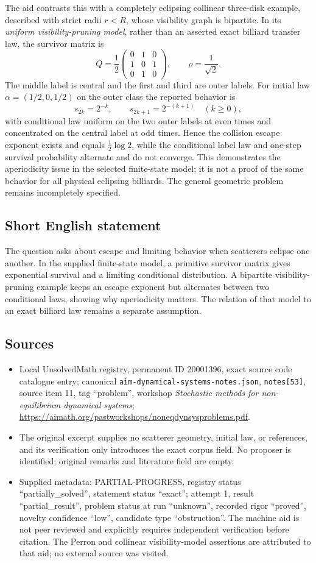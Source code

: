 \documentclass[11pt]{article}
\begin{document}
The aid contrasts this with a completely eclipsing collinear three-disk example, described with strict radii $r<R$, whose visibility graph is bipartite. In its \emph{uniform visibility-pruning model}, rather than an asserted exact billiard transfer law, the survivor matrix is
\[
 Q=\frac12\begin{pmatrix}0&1&0\\1&0&1\\0&1&0\end{pmatrix},
 \qquad\rho=\frac1{\sqrt2}.
\]
The middle label is central and the first and third are outer labels. For initial law $\alpha=(1/2,0,1/2)$ on the outer class the reported behavior is
\[
 s_{2k}=2^{-k},\qquad s_{2k+1}=2^{-(k+1)}\quad(k\geq0),
\]
with conditional law uniform on the two outer labels at even times and concentrated on the central label at odd times. Hence the collision escape exponent exists and equals $\tfrac12\log2$, while the conditional label law and one-step survival probability alternate and do not converge. This demonstrates the aperiodicity issue in the selected finite-state model; it is not a proof of the same behavior for all physical eclipsing billiards. The general geometric problem remains incompletely specified.
\subsection{Short English statement}
The question asks about escape and limiting behavior when scatterers eclipse one another. In the supplied finite-state model, a primitive survivor matrix gives exponential survival and a limiting conditional distribution. A bipartite visibility-pruning example keeps an escape exponent but alternates between two conditional laws, showing why aperiodicity matters. The relation of that model to an exact billiard law remains a separate assumption.
\subsection{Sources}
\begin{itemize}
\item Local UnsolvedMath registry, permanent ID 20001396, exact source code catalogue entry; canonical \texttt{aim-dynamical-systems-notes.json}, \texttt{notes[53]}, source item 11, tag ``problem'', workshop \emph{Stochastic methods for non-equilibrium dynamical systems}; \url{https://aimath.org/pastworkshops/noneqdynsysproblems.pdf}.
\item The original excerpt supplies no scatterer geometry, initial law, or references, and its verification only introduces the exact corpus field. No proposer is identified; original remarks and literature field are empty.
\item Supplied metadata: PARTIAL-PROGRESS, registry status ``partially\_solved'', statement status ``exact''; attempt 1, result ``partial\_result'', problem status at run ``unknown'', recorded rigor ``proved'', novelty confidence ``low'', candidate type ``obstruction''. The machine aid is not peer reviewed and explicitly requires independent verification before citation. The Perron and collinear visibility-model assertions are attributed to that aid; no external source was visited.
\end{itemize}
\end{document}
